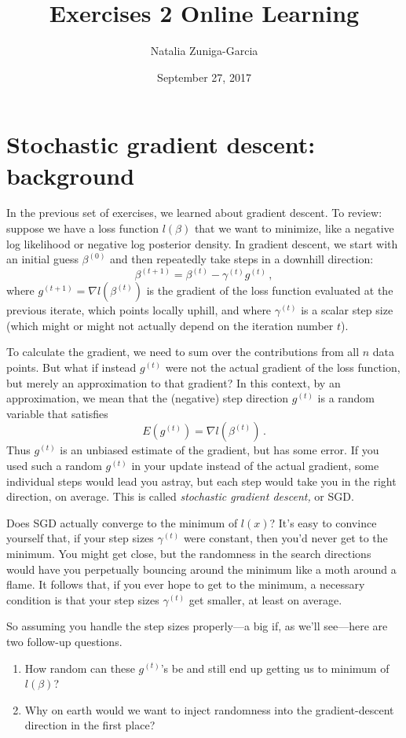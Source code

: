 \documentclass[11 pt]{article}
\author{Natalia Zuniga-Garcia}
\title{Exercises 2 Online Learning}
\date{September 27, 2017}
\begin{document}
\maketitle

\section{Stochastic gradient descent: background}

In the previous set of exercises, we learned about gradient descent.  To review: suppose we have a loss function $l(\beta)$ that we want to minimize, like a negative log likelihood or negative log posterior density.  In gradient descent, we start with an initial guess $\beta^{(0)}$ and then repeatedly take steps in a downhill direction:
$$
\beta^{(t+1)} = \beta^{(t)} - \gamma^{(t)} g^{(t)} \, ,
$$
where $g^{(t+1)}  = \nabla l(\beta^{(t)})$ is the gradient of the loss function evaluated at the previous iterate, which points locally uphill, and where $ \gamma^{(t)}$ is a scalar step size (which might or might not actually depend on the iteration number $t$).

To calculate the gradient, we need to sum over the contributions from all $n$ data points.  But what if instead $g^{(t)}$ were not the actual gradient of the loss function, but merely an approximation to that gradient?  In this context, by an approximation, we mean that the (negative) step direction $g^{(t)}$ is a random variable that satisfies
$$
E(g^{(t)}) = \nabla l(\beta^{(t)}) \, .
$$
Thus $g^{(t)}$ is an unbiased estimate of the gradient, but has some error.   If you used such a random $g^{(t)}$ in your update instead of the actual gradient, some individual steps would lead you astray, but each step would take you in the right direction, on average.  This is called \textit{stochastic gradient descent,} or SGD. 

Does SGD actually converge to the minimum of $l(x)$?  It's easy to convince yourself that, if your step sizes $\gamma^{(t)}$ were constant, then you'd never get to the minimum.  You might get close, but the randomness in the search directions would have you perpetually bouncing around the minimum like a moth around a flame.  It follows that, if you ever hope to get to the minimum, a necessary condition is that your step sizes $\gamma^{(t)}$ get smaller, at least on average.

So assuming you handle the step sizes properly---a big if, as we'll see---here are two follow-up questions.
\begin{enumerate}
	\item How random can these $g^{(t)}$'s be and still end up getting us to minimum of $l(\beta)$? 
	\item Why on earth would we want to inject randomness into the gradient-descent direction in the first place?
\end{enumerate}
\end{document}
